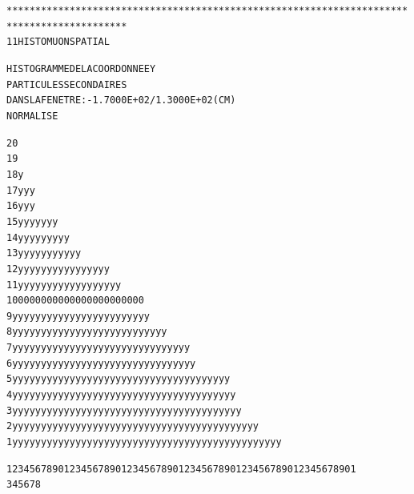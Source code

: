 \begin{alltt}






*******************************************************************************************
     11  HISTO     MUON      SPATIAL 

                              HISTOGRAMME  DE  LA  COORDONNEE  Y    
                              PARTICULES  SECONDAIRES               
                              DANS  LA  FENETRE :  -1.7000E+02 /   1.3000E+02 (CM) 
                              NORMALISE     

   20                                                                                      
   19                                                                                      
   18                                               y                                      
   17                                               y        yy                            
   16                                               y        yy                            
   15                                           y   y y     yyy   y                        
   14                                           y   y y  y  yyyy  y                        
   13                                           y   yyy  yy yyyy  y                        
   12                                          yy y yyy yyy yyyyy y    y                   
   11                                         yyy y yyy yyy yyyyy y    y   y               
   10                                         000 0 000 000000000000   0   00              
    9                                         yyyyy yyy yyyyyyyyyyyy y y   yy              
    8                                        yyyyyyyyyy yyyyyyyyyyyyyy y   yy              
    7                                      yyyyyyyyyyyyyyyyyyyyyyyyyyy y  yyy              
    6                                      yyyyyyyyyyyyyyyyyyyyyyyyyyy y yyyy              
    5                                   y  yyyyyyyyyyyyyyyyyyyyyyyyyyyyyyyyyy yyy          
    4                                   y  yyyyyyyyyyyyyyyyyyyyyyyyyyyyyyyyyyyyyy          
    3                                   y  yyyyyyyyyyyyyyyyyyyyyyyyyyyyyyyyyyyyyyy         
    2                             yy   yy  yyyyyyyyyyyyyyyyyyyyyyyyyyyyyyyyyyyyyyy         
    1                             yy  yyyyyyyyyyyyyyyyyyyyyyyyyyyyyyyyyyyyyyyyyyyyy        

                              1234567890123456789012345678901234567890123456789012345678901
                                       3         4         5         6         7         8



\end{alltt}
